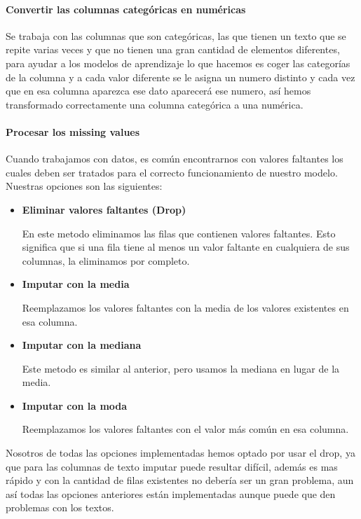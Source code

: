 \documentclass{report}
\begin{document}
{                \paragraph*{Convertir las columnas categóricas en numéricas} {
                    Se trabaja con las columnas que son categóricas, las que tienen un texto que se repite varias veces y que no tienen una gran cantidad de elementos diferentes, para ayudar a los modelos de aprendizaje lo que hacemos es coger las categorías de la columna y a cada valor diferente se le asigna un numero distinto y cada vez que en esa columna aparezca ese dato aparecerá ese numero, así hemos transformado correctamente una columna categórica a una numérica.}
                \paragraph*{Procesar los missing values} { 
                    Cuando trabajamos con datos, es común encontrarnos con valores faltantes los cuales deben ser tratados para el correcto funcionamiento de nuestro modelo. 
                    Nuestras opciones son las siguientes:
                   \begin{itemize}
                      \item \textbf{Eliminar valores faltantes (Drop)}  
                        
                       {En este metodo eliminamos las filas que contienen valores faltantes. Esto significa que si una fila tiene al menos un valor faltante en cualquiera de sus columnas, la eliminamos por completo.}
                      \item \textbf{Imputar con la media}  
                      
                        {Reemplazamos los valores faltantes con la media de los valores existentes en esa columna.}
                      \item \textbf{Imputar con la mediana}  
                      
                        {Este metodo es similar al anterior, pero usamos la mediana en lugar de la media.}
                      \item \textbf{Imputar con la moda}  
                      
                       { Reemplazamos los valores faltantes con el valor más común en esa columna.}
                   \end{itemize}
            {Nosotros de todas las opciones implementadas hemos optado por usar el drop, ya que para las columnas de texto imputar puede resultar difícil, además es mas rápido y con la cantidad de filas existentes no debería ser un gran problema, aun así todas las opciones anteriores están implementadas aunque puede que den problemas con los textos.}}
}
\end{document}
